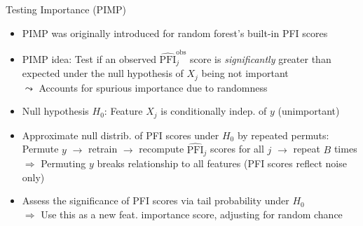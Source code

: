 \documentclass[10pt,compress,t,notes=noshow, xcolor=table]{beamer}
\date{}
\begin{document}


	
	
	

	


\begin{frame}{Testing Importance (PIMP) }

\begin{itemize}[<+->]
  \item PIMP was originally introduced for random forest's built-in PFI scores
  \item PIMP idea: Test if an observed $\widehat{\text{PFI}}_j^{\text{obs}}$ score is \emph{significantly} greater than expected under the null hypothesis of $X_j$ being not important\\
  $\leadsto$ Accounts for spurious importance due to randomness
 \item Null hypothesis $H_0$: Feature $X_j$ is conditionally indep. of $y$ (unimportant)
  \item Approximate null distrib. of PFI scores under $H_0$ by repeated permuts:\\
  Permute $y$ $\rightarrow$ retrain $\rightarrow$ recompute $\widehat{\text{PFI}}_j$ scores for all $j$ $\rightarrow$ repeat $B$ times\\
  $\Rightarrow$ Permuting $y$ breaks relationship to all features (PFI scores reflect noise only)%
  \item
  Assess the significance of PFI scores via tail probability under $H_0$\\
    $\Rightarrow$ Use this as a new feat. importance score, adjusting for random chance
\end{itemize}


\end{frame}
\end{document}
